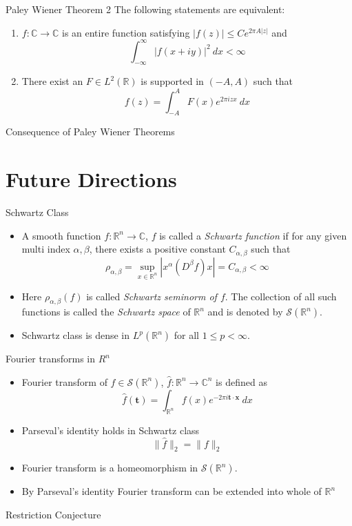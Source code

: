 \documentclass[compress]{beamer}
\newcommand{\R}{\mathbb R}
\newcommand{\C}{\mathbb C}
\begin{document}
\begin{frame}{Paley Wiener Theorem 2}
    The following statements are equivalent:
      \begin{enumerate}
        \item $f: \C \to \C$ is an entire function satisfying $|f(z)| \le Ce^{2\pi A |z|}$ and $$\int_{-\infty}^\infty |f(x+iy)|^2 \ dx < \infty$$
        \item There exist an $F \in L^2(\R)$ is supported in $(-A, A)$ such that $$f(z) = \int_{-A}^A F(x) e^{2\pi iz x} \ dx$$
      \end{enumerate}
\end{frame}

\begin{frame}{Consequence of Paley Wiener Theorems}
\end{frame}


\section{Future Directions}

\begin{frame}{Schwartz Class}
  \begin{itemize}
    \item A smooth function $f:\mathbb{R}^n \to \mathbb{C}$, $f$ is called a \emph{Schwartz function} if for any given multi index $\alpha, \beta$, there exists a positive constant $C_{\alpha, \beta}$ such that $$\rho_{\alpha, \beta} = \sup_{x \in \mathbb{R}^n} \left|x^\alpha (D^\beta f)x \right| = C_{\alpha, \beta} < \infty$$
    \item Here $\rho_{\alpha, \beta}(f)$ is called \emph{Schwartz seminorm of $f$}. The collection of all such functions is called the \emph{Schwartz space} of $\mathbb{R}^n$ and is denoted by $\mathscr{S}(\mathbb{R}^n)$.
    \item Schwartz class is dense in $L^p(\R^n)$ for all $1\le p < \infty$.
  \end{itemize}
\end{frame}

\begin{frame}{Fourier transforms in $R^n$}
  \begin{itemize}
    \item Fourier transform of $f \in \mathscr{S}(\R^n)$, $\hat{f} : \R^n \to \C^n$ is defined as $$\hat{f}( \textbf{t} ) = \int_{\R^n} f(x)e^{-2 \pi i \textbf{t} \cdot \textbf{x}} \ dx$$
    \item Parseval's identity holds in Schwartz class $$\|\hat{f}\|_2 = \|f\|_2$$
    \item Fourier transform is a homeomorphism in $\mathscr{S}(\R^n)$.
    \item By Parseval's identity Fourier transform can be extended into whole of $\R^n$
  \end{itemize}
\end{frame}

\begin{frame}{Restriction Conjecture}
  
\end{frame}
\end{document}
